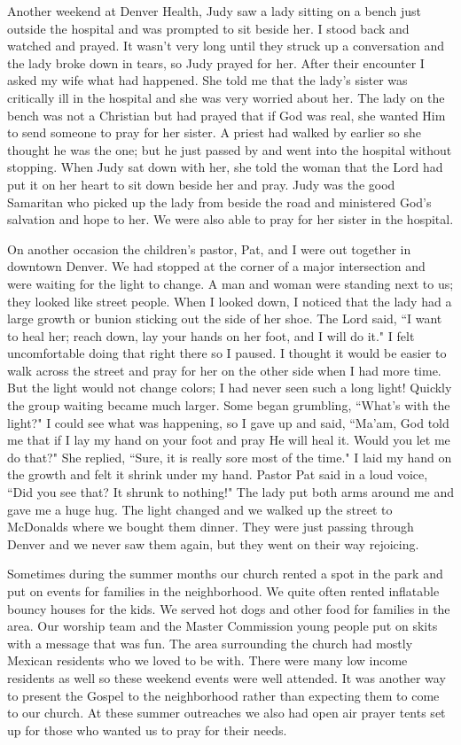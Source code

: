 \documentclass[oneside]{book}
\begin{document}
Another weekend at Denver Health, Judy saw a lady sitting on a bench just outside the hospital and was prompted to sit beside her. I stood back and watched and prayed. It wasn't very long until they struck up a conversation and the lady broke down in tears, so Judy prayed for her. After their encounter I asked my wife what had happened. She told me that the lady's sister was critically ill in the hospital and she was very worried about her. The lady on the bench was not a Christian but had prayed that if God was real, she wanted Him to send someone to pray for her sister. A priest had walked by earlier so she thought he was the one; but he just passed by and went into the hospital without stopping. When Judy sat down with her, she told the woman that the Lord had put it on her heart to sit down beside her and pray. Judy was the good Samaritan who picked up the lady from beside the road and ministered God's salvation and hope to her. We were also able to pray for her sister in the hospital. 


On another occasion the children's pastor, Pat, and I were out together in downtown Denver. We had stopped at the corner of a major intersection and were waiting for the light to change. A man and woman were standing next to us; they looked like street people. When I looked down, I noticed that the lady had a large growth or bunion sticking out the side of her shoe. The Lord said, ``I want to heal her; reach down, lay your hands on her foot, and I will do it." I felt uncomfortable doing that right there so I paused. I thought it would be easier to walk across the street and pray for her on the other side when I had more time. But the light would not change colors; I had never seen such a long light! Quickly the group waiting became much larger. Some began grumbling, ``What's with the light?" I could see what was happening, so I gave up and said, ``Ma'am, God told me that if I lay my hand on your foot and pray He will heal it. Would you let me do that?" She replied, ``Sure, it is really sore most of the time." I laid my hand on the growth and felt it shrink under my hand. Pastor Pat said in a loud voice, ``Did you see that? It shrunk to nothing!" The lady put both arms around me and gave me a huge hug. The light changed and we walked up the street to McDonalds where we bought them dinner. They were just passing through Denver and we never saw them again, but they went on their way rejoicing.

Sometimes during the summer months our church rented a spot in the park and put on events for families in the neighborhood. We quite often rented inflatable bouncy houses for the kids. We served hot dogs and other food for families in the area. Our worship team and the Master Commission young people put on skits with a message that was fun. The area surrounding the church had mostly Mexican residents who we loved to be with. There were many low income residents as well so these weekend events were well attended. It was another way to present the Gospel to the neighborhood rather than expecting them to come to our church. At these summer outreaches we also had open air prayer tents set up for those who wanted us to pray for their needs. 
\end{document}
